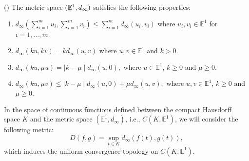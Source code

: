 \documentclass[12pt]{amsart}
\newcommand{\fn}{\mathbb{E}\sp{1}}
\begin{document}
\begin{proposition} \label{properties} (\cite[Proposition 2.3]{FSS17}) The metric space $(\fn, d_\infty)$ satisfies the following properties:
\begin{enumerate}
\item $d_\infty ( \sum_{i=1}^{m}u_{i}, \sum_{i=1}^{m}v_{i}) \le \sum_{i=1}^{m}d_{\infty} (u_i, v_i)$ where $u_i,v_i\in \mathbb{E}^1$ for $i=1,...,m$.
\item  $d_\infty ( ku, kv) = k d_\infty (u, v)$ where $u,v\in \mathbb{E}^1$ and $k>0$.
\item $d_\infty (ku,\mu u ) = \mid k - \mu  \mid d_\infty (u,0),$ where $u \in \mathbb{E}^1$, $ k \ge 0$ and $\mu \ge 0$.
\item $d_\infty (ku,\mu v ) \le \mid k - \mu  \mid d_\infty (u,0) + \mu d_\infty ( u,v),$ where $u,v \in \mathbb{E}^1$, $ k \ge 0$ and $\mu \ge 0$.
\end{enumerate}
\end{proposition}

%
%
%

\bigskip

In the space of continuous functions defined between the compact Hausdorff space $K$ and the metric space $(\mathbb{E}^1, d_\infty)$, i.e., $C(K,\mathbb{E}^1)$, we will consider the following metric:
$$D(f,g) =  \sup_{ t \in K} d_\infty(f(t),g(t)),$$
which induces the uniform convergence topology on $C(K,\mathbb{E}^1)$.


%
%
\end{document}
